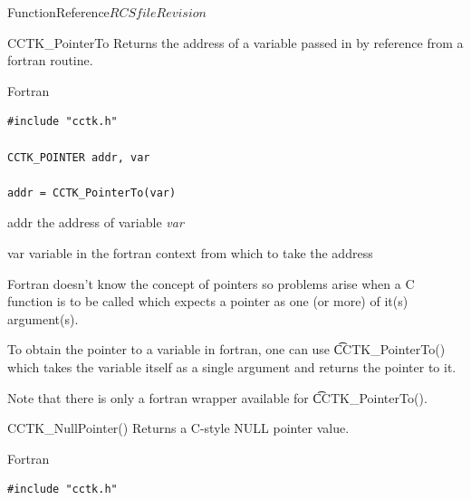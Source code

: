 \begin{cactuspart}{FunctionReference}{$RCSfile$}{$Revision$}
\begin{FunctionDescription}{CCTK\_PointerTo}%
\label{CCTK-PointerTo}
Returns the address of a variable passed in by reference from a fortran routine.

\begin{SynopsisSection}
\begin{Synopsis}{Fortran}
\begin{verbatim}
#include "cctk.h"

CCTK_POINTER addr, var

addr = CCTK_PointerTo(var)
\end{verbatim}
\end{Synopsis}
\end{SynopsisSection}

\begin{ResultSection}
\begin{Result}{addr}
the address of variable {\it var}
\end{Result}
\end{ResultSection}

\begin{ParameterSection}
\begin{Parameter}{var}
variable in the fortran context from which to take the address
\end{Parameter}
\end{ParameterSection}

\begin{Discussion}
Fortran doesn't know the concept of pointers so problems arise when a C function
is to be called which expects a pointer as one (or more) of it(s) argument(s).

To obtain the pointer to a variable in fortran, one can use {\t CCTK\_PointerTo()} which takes the variable itself as a single argument and returns the
pointer to it.

Note that there is only a fortran wrapper available for {\t CCTK\_PointerTo()}.
\end{Discussion}

\begin{SeeAlsoSection}
\begin{SeeAlso}{CCTK\_NullPointer()}
Returns a C-style NULL pointer value.
\end{SeeAlso}
\end{SeeAlsoSection}

\begin{ExampleSection}
\begin{Example}{Fortran}
\begin{verbatim}
#include "cctk.h"


\end{verbatim}
\end{Example}
\end{ExampleSection}
\end{FunctionDescription}
\end{cactuspart}
